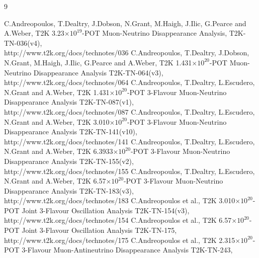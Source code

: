 \clearpage
%
%

\begin{thebibliography}{9}

%
%
   C.Andreopoulos, T.Dealtry, J.Dobson, N.Grant, M.Haigh, J.Ilic, G.Pearce and A.Weber,
   T2K 3.23$\times10^{19}$-POT Muon-Neutrino Disappearance Analysis,
   T2K-TN-036(v4),\\
   http://www.t2k.org/docs/technotes/036
   C.Andreopoulos, T.Dealtry, J.Dobson, N.Grant, M.Haigh, J.Ilic, G.Pearce and A.Weber,
   T2K 1.431$\times10^{20}$-POT Muon-Neutrino Disappearance Analysis
   T2K-TN-064(v3),\\
   http://www.t2k.org/docs/technotes/064
   C.Andreopoulos, T.Dealtry, L.Escudero, N.Grant and A.Weber,
   T2K 1.431$\times10^{20}$-POT 3-Flavour Muon-Neutrino Disappearance Analysis
   T2K-TN-087(v1),\\
   http://www.t2k.org/docs/technotes/087
   C.Andreopoulos, T.Dealtry, L.Escudero, N.Grant and A.Weber,
   T2K 3.010$\times10^{20}$-POT 3-Flavour Muon-Neutrino Disappearance Analysis
   T2K-TN-141(v10),\\
   http://www.t2k.org/docs/technotes/141
   C.Andreopoulos, T.Dealtry, L.Escudero, N.Grant and A.Weber,
   T2K 6.3933$\times10^{20}$-POT 3-Flavour Muon-Neutrino Disappearance Analysis
   T2K-TN-155(v2),\\
   http://www.t2k.org/docs/technotes/155
   C.Andreopoulos, T.Dealtry, L.Escudero, N.Grant and A.Weber,
   T2K 6.57$\times10^{20}$-POT 3-Flavour Muon-Neutrino Disappearance Analysis
   T2K-TN-183(v3),\\
   http://www.t2k.org/docs/technotes/183
   C.Andreopoulos et al.,
   T2K 3.010$\times10^{20}$-POT Joint 3-Flavour Oscillation Analysis
   T2K-TN-154(v3),\\
   http://www.t2k.org/docs/technotes/154
   C.Andreopoulos et al.,
   T2K 6.57$\times10^{20}$-POT Joint 3-Flavour Oscillation Analysis
   T2K-TN-175,\\
   http://www.t2k.org/docs/technotes/175
   C.Andreopoulos et al.,
   T2K 2.315$\times10^{20}$-POT 3-Flavour Muon-Antineutrino Disappearance Analysis
   T2K-TN-243,\\

\end{thebibliography}
